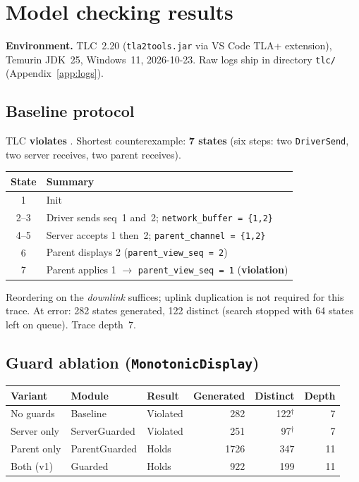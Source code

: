 \documentclass[11pt,a4paper]{article}
\begin{document}
\section{Model checking results}
\label{sec:results}

\textbf{Environment.} TLC~2.20 (\texttt{tla2tools.jar} via VS Code TLA+ extension), Temurin JDK~25, Windows~11, 2026-10-23. Raw logs ship in directory \texttt{tlc/} (Appendix~\ref{app:logs}).

\subsection{Baseline protocol}

TLC \textbf{violates} . Shortest counterexample: \textbf{7 states} (six steps: two \texttt{DriverSend}, two server receives, two parent receives).

\begin{center}
\begin{tabular}{@{}cl@{}}
\toprule
State & Summary \\
\midrule
1 & Init \\
2--3 & Driver sends seq~1 and~2; \texttt{network\_buffer = \{1,2\}} \\
4--5 & Server accepts 1 then~2; \texttt{parent\_channel = \{1,2\}} \\
6 & Parent displays 2 (\texttt{parent\_view\_seq = 2}) \\
7 & Parent applies 1 $\rightarrow$ \texttt{parent\_view\_seq = 1} (\textbf{violation}) \\
\bottomrule
\end{tabular}
\end{center}

Reordering on the \emph{downlink} suffices; uplink duplication is not required for this trace. At error: 282 states generated, 122 distinct (search stopped with 64 states left on queue). Trace depth~7.

\subsection{Guard ablation (\texttt{MonotonicDisplay})}

\begin{center}
\begin{tabular}{@{}lllrrr@{}}
\toprule
Variant & Module & Result & Generated & Distinct & Depth \\
\midrule
No guards & Baseline & Violated & 282 & 122$^\dagger$ & 7 \\
Server only & ServerGuarded & Violated & 251 & 97$^\dagger$ & 7 \\
Parent only & ParentGuarded & Holds & 1726 & 347 & 11 \\
Both (v1) & Guarded & Holds & 922 & 199 & 11 \\
\bottomrule
\end{tabular}
\end{center}
\end{document}
